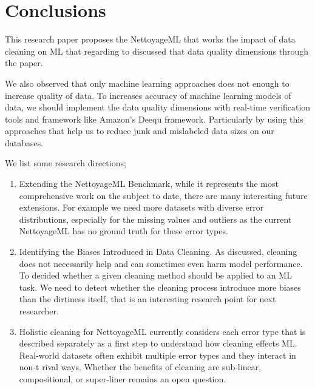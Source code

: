 \section{Conclusions}

This research paper proposes the NettoyageML that works the impact of data cleaning on ML that regarding to discussed that data quality dimensions through the paper. 

We also observed that only machine learning approaches does not enough to increase quality of data. To increases accuracy of machine learning models of data, we should implement the 
data quality dimensions with real-time verification tools and framework like Amazon's Deequ framework. 
Particularly by using this approaches that help us to reduce junk and mislabeled data sizes on our databases.

We list some research directions; 

\begin{enumerate}
	\item  {Extending the NettoyageML Benchmark, while it represents the most comprehensive work on the subject to date, there are many 
		interesting future extensions. For example we need more datasets with diverse error distributions, especially for the missing values and outliers as the current NettoyageML has no ground truth 
		for these error types.
	}

	\item {
		Identifying the Biases Introduced in Data Cleaning. As discussed, cleaning does not necessarily 
		help and can sometimes  even harm model performance. To decided  whether a given cleaning method should be applied to an ML task.
		We need to detect whether the cleaning process introduce more biases than the dirtiness itself, that is an interesting research point for next researcher.
	}

	\item {
		Holistic cleaning for NettoyageML currently considers each error type that is described separately 
		as a first step to understand how cleaning effects ML. Real-world datasets often exhibit multiple 
		error types and they interact in non-t rival ways.
		Whether the benefits of cleaning are sub-linear, compositional, or super-liner remains an open question.
	}
\end{enumerate}
